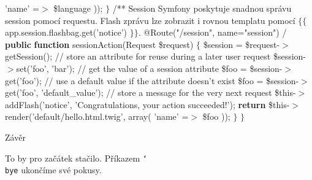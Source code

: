  {\Cyan 'name'} =$>$ \$language\codetexNewline
{} ));\codetexNewline
{} $\}$\codetexNewline
{} \codetexNewline
{} {\Grey /**}\codetexNewline
{} {\Grey * Session}\codetexNewline
{} {\Grey * Symfony poskytuje snadnou správu session pomocí requestu.}\codetexNewline
{} {\Grey * Flash zprávu lze zobrazit i rovnou templatu pomocí $\{$$\{$ app.session.flashbag.get('notice') $\}$$\}$.}\codetexNewline
{} {\Grey *}\codetexNewline
{} {\Grey * @Route("/session", name="session")}\codetexNewline
{} {\Grey */}\codetexNewline
{} {\bf {\Green public}} {\bf {\Green function}} sessionAction(Request \$request)\codetexNewline
{} $\{$\codetexNewline
{} \$session = \$request-$>$getSession();\codetexNewline
{} \codetexNewline
{} {\Grey // store an attribute for reuse during a later user request}\codetexNewline
{} \$session-$>$set({\Cyan 'foo'}, {\Cyan 'bar'});\codetexNewline
{} \codetexNewline
{} {\Grey // get the value of a session attribute}\codetexNewline
{} \$foo = \$session-$>$get({\Cyan 'foo'});\codetexNewline
{} \codetexNewline
{} {\Grey // use a default value if the attribute doesn't exist}\codetexNewline
{} \$foo = \$session-$>$get({\Cyan 'foo'}, {\Cyan 'default\_value'});\codetexNewline
{} \codetexNewline
{} {\Grey // store a message for the very next request}\codetexNewline
{} \$this-$>$addFlash({\Cyan 'notice'}, {\Cyan 'Congratulations, your action succeeded!'});\codetexNewline
{} \codetexNewline
{} {\bf {\Green return}} \$this-$>$render({\Cyan 'default/hello.html.twig'}, array(\codetexNewline
{} {\Cyan 'name'} =$>$ \$foo\codetexNewline
{} ));\codetexNewline
{} $\}$\codetexNewline
{} $\}$\codetexNewline
\endgroup
\bigbreak

\nadpis Závěr

To by pro začátek stačilo. Příkazem {\tt\char`\\bye} ukončíme své pokusy.
\bye

